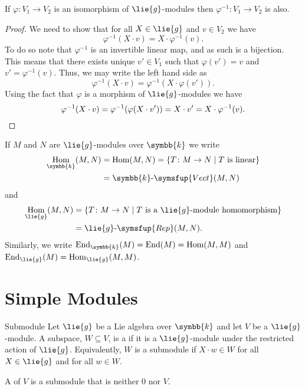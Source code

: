 \documentclass[fleqn]{NotesClass}
\makeatletter
\renewcommand{\field}{\symbb{k}}
\newcommand{\c@egory}[1]{\symsfup{#1}}
\newcommand{\Vect}[1][\field]{#1\text{-}\c@egory{Vect}}
\newcommand{\Rep}[1][\lie{g}]{#1\text{-}\c@egory{Rep}}
\DeclareMathOperator{\Hom}{Hom}
\DeclareMathOperator{\End}{End}
\makeatother
\begin{document}
    \begin{lma}{}{}
        If \(\varphi \colon V_1 \to V_2\) is an isomorphism of \(\lie{g}\)-modules then \(\varphi^{-1} \colon V_1 \to V_2\) is also.
        \begin{proof}
            We need to show that for all \(X \in \lie{g}\) and \(v \in V_2\) we have
            \begin{equation}
                \varphi^{-1}(X \cdot v) = X \cdot \varphi^{-1}(v).
            \end{equation}
            To do so note that \(\varphi^{-1}\) is an invertible linear map, and as such is a bijection.
            This means that there exists unique \(v' \in V_1\) such that \(\varphi(v') = v\) and \(v' = \varphi^{-1}(v)\).
            Thus, we may write the left hand side as
            \begin{equation}
                \varphi^{-1}(X \cdot v) = \varphi^{-1}(X \cdot \varphi(v')).
            \end{equation}
            Using the fact that \(\varphi\) is a morphism of \(\lie{g}\)-modules we have
            \begin{equation}
                \varphi^{-1}(X \cdot v) = \varphi^{-1}(\varphi(X \cdot v')) = X \cdot v' = X \cdot \varphi^{-1}(v). \qedhere
            \end{equation}
        \end{proof}
    \end{lma}
    
    \begin{ntn}{}{}
        If \(M\) and \(N\) are \(\lie{g}\)-modules over \(\field\) we write
        \begin{align}
            \Hom_{\field}(M, N) &= \Hom(M, N) = \{T \colon M \to N \mid T \text{ is linear}\}\\
            &= \Vect(M, N)
        \end{align}
        and
        \begin{align}
            \Hom_{\lie{g}}(M, N) &= \{T \colon M \to N \mid T \text{ is a } \lie{g} \text{-module homomorphism}\} \notag\\
            &= \Rep(M, N).
        \end{align}
        Similarly, we write \(\End_{\field}(M) = \End(M) = \Hom(M, M)\) and \(\End_{\lie{g}}(M) = \Hom_{\lie{g}}(M, M)\).
    \end{ntn}
    
    \section{Simple Modules}
    \begin{dfn}{Submodule}{}
        Let \(\lie{g}\) be a Lie algebra over \(\field\) and let \(V\) be a \(\lie{g}\)-module.
        A subspace, \(W \subseteq V\), is a  if it is a \(\lie{g}\)-module under the restricted action of \(\lie{g}\).
        Equivalently, \(W\) is a submodule if \(X \cdot w \in W\) for all \(X \in \lie{g}\) and for all \(w \in W\).
        
        A  of \(V\) is a submodule that is neither \(0\) nor \(V\).
    \end{dfn}
    
\end{document}
